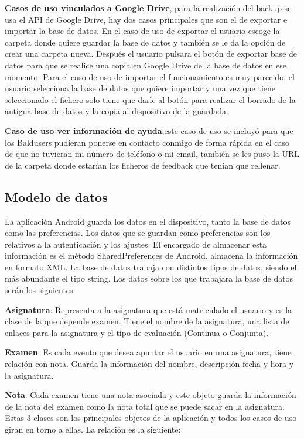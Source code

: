 \textbf{Casos de uso vinculados a Google Drive}, para la realización del backup se usa el API de Google Drive, hay dos casos principales que son el de exportar e importar la base de datos.
En el caso de uso de exportar el usuario escoge la carpeta donde quiere guardar la base de datos y también se le da la opción de crear una carpeta nueva.
Después el usuario pulsara el botón de exportar base de datos para que se realice una copia en Google Drive de la base de datos en ese momento.
Para el caso de uso de importar el funcionamiento es muy parecido, el usuario selecciona la base de datos que quiere importar y una vez que tiene seleccionado el fichero solo tiene que darle al botón para realizar el borrado de la antigua base de datos y la copia al dispositivo de la guardada.

\textbf{Caso de uso ver información de ayuda},este caso de uso se incluyó para que los Baldusers pudieran ponerse en contacto conmigo de forma rápida en el caso de que no tuvieran mi número de teléfono o mi email, también se les puso la URL de la carpeta donde estarían los ficheros de feedback que tenían que rellenar.

\subsection{Modelo de datos}
\label{subsecc:modelo de datos}

La aplicación Android guarda los datos en el dispositivo, tanto la base de datos como las preferencias.
Los datos que se guardan como preferencias son los relativos a la autenticación y los ajustes. El encargado de almacenar esta información es el método SharedPreferences de Android, almacena la información en formato XML.
La base de datos trabaja con distintos tipos de datos, siendo el más abundante el tipo string.
Los datos sobre los que trabajara la base de datos serán los siguientes:

\textbf{Asignatura}: Representa a la asignatura que está matriculado el usuario y es la clase de la que depende examen. Tiene el nombre de la asignatura, una  lista de enlaces para la asignatura  y el tipo de evaluación (Continua o Conjunta).

\textbf{Examen}: Es cada evento que desea apuntar el usuario en una asignatura, tiene relación con nota. Guarda la información del nombre, descripción fecha y hora y la asignatura.

\textbf{Nota}: Cada examen tiene una nota asociada y este objeto guarda la información de la nota del examen como la nota total que se puede sacar en la asignatura.
Estas 3 clases son los principales objetos de la aplicación y todos los casos de uso giran en torno a ellas.
La relación es la siguiente:

